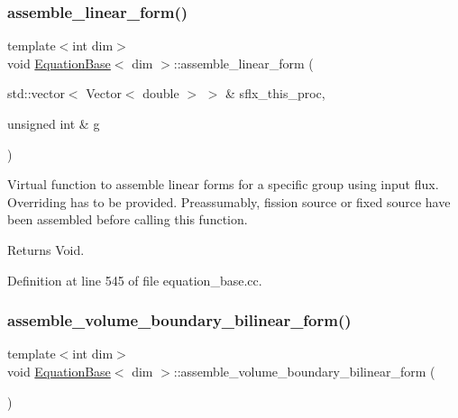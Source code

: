 \subsubsection{\texorpdfstring{assemble\+\_\+linear\+\_\+form()}{assemble\_linear\_form()}}
{\footnotesize\ttfamily template$<$int dim$>$ \\
void \hyperlink{class_equation_base}{Equation\+Base}$<$ dim $>$\+::assemble\+\_\+linear\+\_\+form (\begin{DoxyParamCaption}\item[{std\+::vector$<$ Vector$<$ double $>$ $>$ \&}]{sflx\+\_\+this\+\_\+proc,  }\item[{unsigned int \&}]{g }\end{DoxyParamCaption})\hspace{0.3cm}{\ttfamily [virtual]}}

Virtual function to assemble linear forms for a specific group using input flux. Overriding has to be provided. Preassumably, fission source or fixed source have been assembled before calling this function.

\begin{DoxyReturn}{Returns}
Void. 
\end{DoxyReturn}


Definition at line 545 of file equation\+\_\+base.\+cc.

\mbox{\label{class_equation_base_a42472101cbaeab32d22c4e8ff1dc9830}} 
\subsubsection{\texorpdfstring{assemble\+\_\+volume\+\_\+boundary\+\_\+bilinear\+\_\+form()}{assemble\_volume\_boundary\_bilinear\_form()}}
{\footnotesize\ttfamily template$<$int dim$>$ \\
void \hyperlink{class_equation_base}{Equation\+Base}$<$ dim $>$\+::assemble\+\_\+volume\+\_\+boundary\+\_\+bilinear\+\_\+form (\begin{DoxyParamCaption}{ }\end{DoxyParamCaption})\hspace{0.3cm}{\ttfamily [virtual]}}

